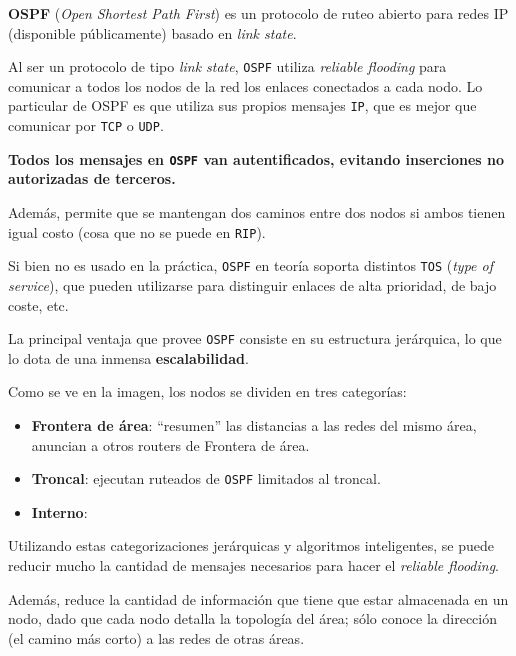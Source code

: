\documentclass[]{article}
\begin{document}

\textbf{OSPF} (\emph{Open Shortest Path First}) es un protocolo de ruteo abierto para redes IP (disponible públicamente) basado en \emph{link state}.

Al ser un protocolo de tipo \emph{link state}, \texttt{OSPF} utiliza \emph{reliable flooding} para comunicar a todos los nodos de la red los enlaces conectados a cada nodo. Lo particular de OSPF es que utiliza sus propios mensajes \texttt{IP}, que es mejor que comunicar por \texttt{TCP} o \texttt{UDP}.

\textbf{Todos los mensajes en \texttt{OSPF} van autentificados, evitando inserciones no autorizadas de terceros.}

Además, permite que se mantengan dos caminos entre dos nodos si ambos tienen igual costo (cosa que no se puede en \texttt{RIP}).

Si bien no es usado en la práctica, \texttt{OSPF} en teoría soporta distintos \texttt{TOS} (\emph{type of service}), que pueden utilizarse para distinguir enlaces de alta prioridad, de bajo coste, etc.

La principal ventaja que provee \texttt{OSPF} consiste en su estructura jerárquica, lo que lo dota de una inmensa \textbf{escalabilidad}.



Como se ve en la imagen, los nodos se dividen en tres categorías:
\begin{itemize}
    \item \textbf{Frontera de área}: ``resumen'' las distancias a las redes del mismo área, anuncian a otros routers de Frontera de área.
    \item \textbf{Troncal}: ejecutan ruteados de \texttt{OSPF} limitados al troncal.
    \item \textbf{Interno}:
\end{itemize}

Utilizando estas categorizaciones jerárquicas y algoritmos inteligentes, se puede reducir mucho la cantidad de mensajes necesarios para hacer el \emph{reliable flooding}.

Además, reduce la cantidad de información que tiene que estar almacenada en un nodo, dado que cada nodo detalla la topología del área; sólo conoce la dirección (el camino más corto) a las redes de otras áreas.
\end{document}
